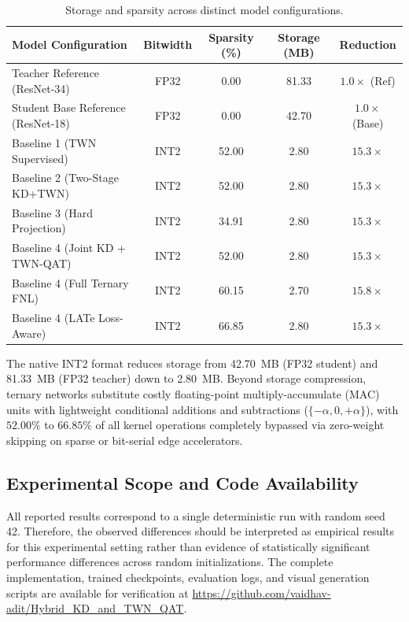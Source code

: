 \documentclass[conference]{IEEEtran}
\begin{document}
\begin{table}[H]
\centering
\caption{Storage and sparsity across distinct model configurations.}
\label{tab:hardware_compression}
\scriptsize
\begin{tabular}{@{}lcccc@{}}
\toprule
\textbf{Model Configuration} &
\textbf{Bitwidth} &
\textbf{Sparsity (\%)} &
\textbf{Storage (MB)} &
\textbf{Reduction} \\
\midrule
Teacher Reference (ResNet-34) & FP32 & 0.00 & 81.33 & $1.0\times$ (Ref) \\
Student Base Reference (ResNet-18) & FP32 & 0.00 & 42.70 & $1.0\times$ (Base) \\
Baseline 1 (TWN Supervised) & INT2 & 52.00 & 2.80 & $15.3\times$ \\
Baseline 2 (Two-Stage KD+TWN) & INT2 & 52.00 & 2.80 & $15.3\times$ \\
Baseline 3 (Hard Projection) & INT2 & 34.91 & 2.80 & $15.3\times$ \\
Baseline 4 (Joint KD + TWN-QAT) & INT2 & 52.00 & 2.80 & $15.3\times$ \\
Baseline 4 (Full Ternary FNL) & INT2 & 60.15 & 2.70 & $15.8\times$ \\
Baseline 4 (LATe Loss-Aware) & INT2 & 66.85 & 2.80 & $15.3\times$ \\
\bottomrule
\end{tabular}
\end{table}

The native INT2 format reduces storage from 42.70~MB (FP32 student) and 81.33~MB
(FP32 teacher) down to 2.80~MB. Beyond storage compression, ternary networks
substitute costly floating-point multiply-accumulate (MAC) units with lightweight
conditional additions and subtractions ($\{-\alpha, 0, +\alpha\}$), with
$52.00\%$ to $66.85\%$ of all kernel operations completely bypassed via zero-weight
skipping on sparse or bit-serial edge accelerators.


\subsection{Experimental Scope and Code Availability}

All reported results correspond to a single deterministic run with
random seed 42. Therefore, the observed differences should be
interpreted as empirical results for this experimental setting rather
than evidence of statistically significant performance differences
across random initializations. The complete implementation, trained
checkpoints, evaluation logs, and visual generation scripts are
available for verification at
\url{https://github.com/vaidhav-adit/Hybrid_KD_and_TWN_QAT}.
\end{document}
